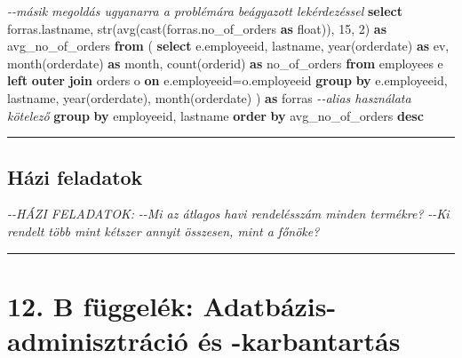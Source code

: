 \documentclass[
  magyar,
]{article}
\newenvironment{Shaded}{}{}
\newcommand{\CommentTok}[1]{\textcolor[rgb]{0.38,0.63,0.69}{\textit{#1}}}
\newcommand{\DataTypeTok}[1]{\textcolor[rgb]{0.56,0.13,0.00}{#1}}
\newcommand{\DecValTok}[1]{\textcolor[rgb]{0.25,0.63,0.44}{#1}}
\newcommand{\FunctionTok}[1]{\textcolor[rgb]{0.02,0.16,0.49}{#1}}
\newcommand{\KeywordTok}[1]{\textcolor[rgb]{0.00,0.44,0.13}{\textbf{#1}}}
\newcommand{\NormalTok}[1]{#1}
\newcommand{\OperatorTok}[1]{\textcolor[rgb]{0.40,0.40,0.40}{#1}}
\begin{document}
\begin{Shaded}
\begin{Highlighting}[]
\CommentTok{{-}{-}másik megoldás ugyanarra a problémára beágyazott lekérdezéssel}
\KeywordTok{select}\NormalTok{ forras.lastname, str(}\FunctionTok{avg}\NormalTok{(}\FunctionTok{cast}\NormalTok{(forras.no\_of\_orders }\KeywordTok{as} \DataTypeTok{float}\NormalTok{)), }\DecValTok{15}\NormalTok{, }\DecValTok{2}\NormalTok{) }\KeywordTok{as}
\NormalTok{avg\_no\_of\_orders}
\KeywordTok{from}\NormalTok{ (}
  \KeywordTok{select}\NormalTok{ e.employeeid, lastname, }\DataTypeTok{year}\NormalTok{(orderdate) }\KeywordTok{as}\NormalTok{ ev, }\DataTypeTok{month}\NormalTok{(orderdate) }\KeywordTok{as} \DataTypeTok{month}\NormalTok{,}
  \FunctionTok{count}\NormalTok{(orderid) }\KeywordTok{as}\NormalTok{ no\_of\_orders}
  \KeywordTok{from}\NormalTok{ employees e }\KeywordTok{left} \KeywordTok{outer} \KeywordTok{join}\NormalTok{ orders o }\KeywordTok{on}\NormalTok{ e.employeeid}\OperatorTok{=}\NormalTok{o.employeeid}
  \KeywordTok{group} \KeywordTok{by}\NormalTok{ e.employeeid, lastname, }\DataTypeTok{year}\NormalTok{(orderdate), }\DataTypeTok{month}\NormalTok{(orderdate)}
\NormalTok{) }\KeywordTok{as}\NormalTok{ forras }\CommentTok{{-}{-}alias használata kötelező}
\KeywordTok{group} \KeywordTok{by}\NormalTok{ employeeid, lastname}
\KeywordTok{order} \KeywordTok{by}\NormalTok{ avg\_no\_of\_orders }\KeywordTok{desc}
\end{Highlighting}
\end{Shaded}

\begin{center}\rule{0.5\linewidth}{0.5pt}\end{center}

\subsection{Házi feladatok}\label{huxe1zi-feladatok}

\begin{Shaded}
\begin{Highlighting}[]
\CommentTok{{-}{-}HÁZI FELADATOK:}
\CommentTok{{-}{-}Mi az átlagos havi rendelésszám minden termékre?}
\CommentTok{{-}{-}Ki rendelt több mint kétszer annyit összesen, mint a főnöke?}
\end{Highlighting}
\end{Shaded}

\begin{center}\rule{0.5\linewidth}{0.5pt}\end{center}

\section{12. B függelék: Adatbázis-adminisztráció és
-karbantartás}\label{b-fuxfcggeluxe9k-adatbuxe1zis-adminisztruxe1ciuxf3-uxe9s--karbantartuxe1s}
\end{document}
